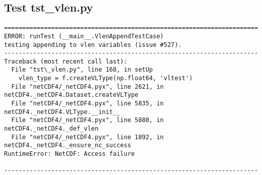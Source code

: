 \subsection{Test tst\_vlen.py}

\begin{verbatim}
======================================================================
ERROR: runTest (__main__.VlenAppendTestCase)
testing appending to vlen variables (issue #527).
----------------------------------------------------------------------
Traceback (most recent call last):
  File "tst\_vlen.py", line 168, in setUp
    vlen_type = f.createVLType(np.float64, 'vltest')
  File "netCDF4/_netCDF4.pyx", line 2621, in netCDF4._netCDF4.Dataset.createVLType
  File "netCDF4/_netCDF4.pyx", line 5835, in netCDF4._netCDF4.VLType.__init__
  File "netCDF4/_netCDF4.pyx", line 5880, in netCDF4._netCDF4._def_vlen
  File "netCDF4/_netCDF4.pyx", line 1892, in netCDF4._netCDF4._ensure_nc_success
RuntimeError: NetCDF: Access failure

----------------------------------------------------------------------
\end{verbatim}

\begin{comment}

\section{nccopy}

esiwace/esdm-netcdf/build/ncdump/nccopy

nccopy input_file esdm://output_file

\section{netcdf-bench}

esiwace/esdm-netcdf/libsrcesdm_test/netcdf-bench

./prepare.sh

\end{comment}
